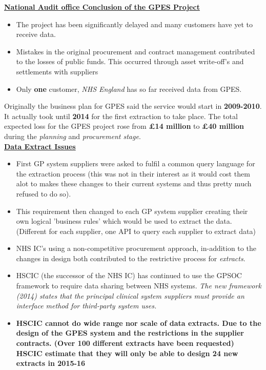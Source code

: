 \documentclass[a4paper]{article}
\begin{document}
\underline{\textbf{National Audit office Conclusion of the GPES Project}}
\begin{itemize}
\item The project has been significantly delayed and many customers have yet to receive data.
\item Mistakes in the original procurement and contract management contributed to the losses of public funds. This occurred through asset write-off's and settlements with suppliers
\item Only \textbf{one} customer, \textit{NHS England} has so far received data from GPES.\\
\end{itemize}

Originally the business plan for GPES said the service would start in \textbf{2009-2010}. It actually took until \textbf{2014} for the first extraction to take place. The total expected loss for the GPES project rose from \textbf{£14 million} to \textbf{£40 million} during the \textit{planning} and \textit{procurement stage}.\\

\underline{\textbf{Data Extract Issues}}
\begin{itemize}
\item First GP system suppliers were asked to fulfil a common query language for the extraction process (this was not in their interest as it would cost them alot to makes these changes to their current systems and thus pretty much refused to do so).
\item This requirement then changed to each GP system supplier creating their own logical 'business rules' which would be used to extract the data. (Different for each supplier, one API to query each supplier to extract data)
\item NHS IC's using a non-competitive procurement approach, in-addition to the changes in design both contributed to the restrictive process for \textit{extracts}.
\item HSCIC (the successor of the NHS IC) has continued to use the GPSOC framework to require data sharing between NHS systems. \textit{The new framework (2014) states that the principal clinical system suppliers must provide an interface method for third-party system uses.}

\item \textbf{HSCIC cannot do wide range nor scale of data extracts. Due to the design of the GPES system and the restrictions in the supplier contracts. (Over 100 different extracts have been requested) HSCIC estimate that they will only be able to design 24 new extracts in 2015-16}\\
\end{itemize}
\end{document}
